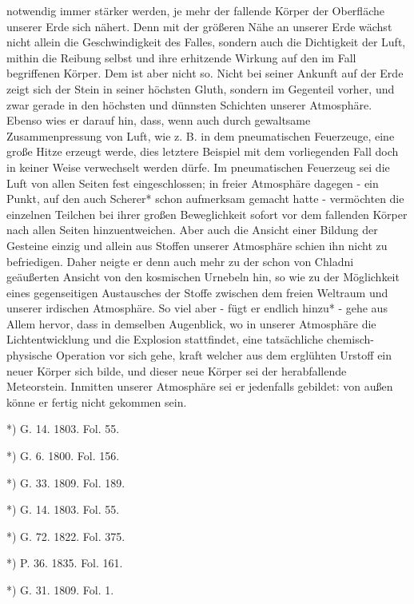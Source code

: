 \documentclass[a4paper, 8pt, oneside, polutonikogreek, german]{article}
\begin{document}
notwendig immer stärker werden, je mehr der fallende Körper der Oberfläche unserer Erde sich nähert. Denn mit der größeren Nähe an unserer Erde wächst nicht allein die Geschwindigkeit des Falles, sondern auch die Dichtigkeit der Luft, mithin die Reibung selbst und ihre erhitzende Wirkung auf den im Fall begriffenen Körper. Dem ist aber nicht so. Nicht bei seiner Ankunft auf der Erde zeigt sich der Stein in seiner höchsten Gluth, sondern im Gegenteil vorher, und zwar gerade in den höchsten und dünnsten Schichten unserer Atmosphäre. Ebenso wies er darauf hin, dass, wenn auch durch gewaltsame Zusammenpressung von Luft, wie z. B. in dem pneumatischen Feuerzeuge, eine große Hitze erzeugt werde, dies letztere Beispiel mit dem vorliegenden Fall doch in keiner Weise verwechselt werden dürfe. Im pneumatischen Feuerzeug sei die Luft von allen Seiten fest eingeschlossen; in freier Atmosphäre dagegen - ein Punkt, auf den auch Scherer* schon aufmerksam gemacht hatte - vermöchten die einzelnen Teilchen bei ihrer großen Beweglichkeit sofort vor dem fallenden Körper nach allen Seiten hinzuentweichen. Aber auch die Ansicht einer Bildung der Gesteine einzig und allein aus Stoffen unserer Atmosphäre schien ihn nicht zu befriedigen. Daher neigte er denn auch mehr zu der schon von Chladni geäußerten Ansicht von den kosmischen Urnebeln hin, so wie zu der Möglichkeit eines gegenseitigen Austausches der Stoffe zwischen dem freien Weltraum und unserer irdischen Atmosphäre. So viel aber - fügt er endlich hinzu* - gehe aus Allem hervor, dass in demselben Augenblick, wo in unserer Atmosphäre die Lichtentwicklung und die Explosion stattfindet, eine tatsächliche chemisch-physische Operation vor sich gehe, kraft welcher aus dem erglühten Urstoff ein neuer Körper sich bilde, und dieser neue Körper sei der herabfallende Meteorstein. Inmitten unserer Atmosphäre sei er jedenfalls gebildet: von außen könne er fertig nicht gekommen sein.

*) G. 14. 1803. Fol. 55.

*) G. 6. 1800. Fol. 156.

*) G. 33. 1809. Fol. 189.

*) G. 14. 1803. Fol. 55.

*) G. 72. 1822. Fol. 375.

*) P. 36. 1835. Fol. 161.

*) G. 31. 1809. Fol. 1.
\end{document}
